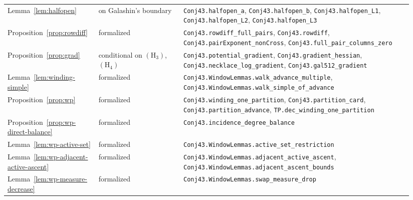 \documentclass[11pt]{article}
\theoremstyle{definition}
\begin{document}
\begin{longtable}{@{}>{\raggedright\arraybackslash}p{0.2\linewidth}>{\raggedright\arraybackslash}p{0.2\linewidth}>{\raggedright\arraybackslash}p{0.54\linewidth}@{}}
Lemma~\ref{lem:halfopen} & on Galashin's boundary & \texttt{Conj43.\allowbreak halfopen\_\allowbreak a}, \texttt{Conj43.\allowbreak halfopen\_\allowbreak b}, \texttt{Conj43.\allowbreak halfopen\_\allowbreak L1}, \texttt{Conj43.\allowbreak halfopen\_\allowbreak L2}, \texttt{Conj43.\allowbreak halfopen\_\allowbreak L3} \\
Proposition~\ref{prop:rowdiff} & formalized & \texttt{Conj43.\allowbreak rowdiff\_\allowbreak full\_\allowbreak pairs}, \texttt{Conj43.\allowbreak rowdiff}, \texttt{Conj43.\allowbreak pairExponent\_\allowbreak nonCross}, \texttt{Conj43.\allowbreak full\_\allowbreak pair\_\allowbreak columns\_\allowbreak zero} \\
Proposition~\ref{prop:grad} & conditional on $(\mathrm H_3)$, $(\mathrm H_4)$ & \texttt{Conj43.\allowbreak potential\_\allowbreak gradient}, \texttt{Conj43.\allowbreak gradient\_\allowbreak hessian}, \texttt{Conj43.\allowbreak necklace\_\allowbreak log\_\allowbreak gradient}, \texttt{Conj43.\allowbreak gal512\_\allowbreak gradient} \\
Lemma~\ref{lem:winding-simple} & formalized & \texttt{Conj43.\allowbreak WindowLemmas.\allowbreak walk\_\allowbreak advance\_\allowbreak multiple}, \texttt{Conj43.\allowbreak WindowLemmas.\allowbreak walk\_\allowbreak simple\_\allowbreak of\_\allowbreak advance} \\
Proposition~\ref{prop:wp} & formalized & \texttt{Conj43.\allowbreak winding\_\allowbreak one\_\allowbreak partition}, \texttt{Conj43.\allowbreak partition\_\allowbreak card}, \texttt{Conj43.\allowbreak partition\_\allowbreak advance}, \texttt{TP.\allowbreak dec\_\allowbreak winding\_\allowbreak one\_\allowbreak partition} \\
Proposition~\ref{prop:wp-direct-balance} & formalized & \texttt{Conj43.\allowbreak incidence\_\allowbreak degree\_\allowbreak balance} \\
Lemma~\ref{lem:wp-active-set} & formalized & \texttt{Conj43.\allowbreak WindowLemmas.\allowbreak active\_\allowbreak set\_\allowbreak restriction} \\
Lemma~\ref{lem:wp-adjacent-active-ascent} & formalized & \texttt{Conj43.\allowbreak WindowLemmas.\allowbreak adjacent\_\allowbreak active\_\allowbreak ascent}, \texttt{Conj43.\allowbreak WindowLemmas.\allowbreak adjacent\_\allowbreak ascent\_\allowbreak bounds} \\
Lemma~\ref{lem:wp-measure-decrease} & formalized & \texttt{Conj43.\allowbreak WindowLemmas.\allowbreak swap\_\allowbreak measure\_\allowbreak drop} \\

\end{longtable}
\end{document}
